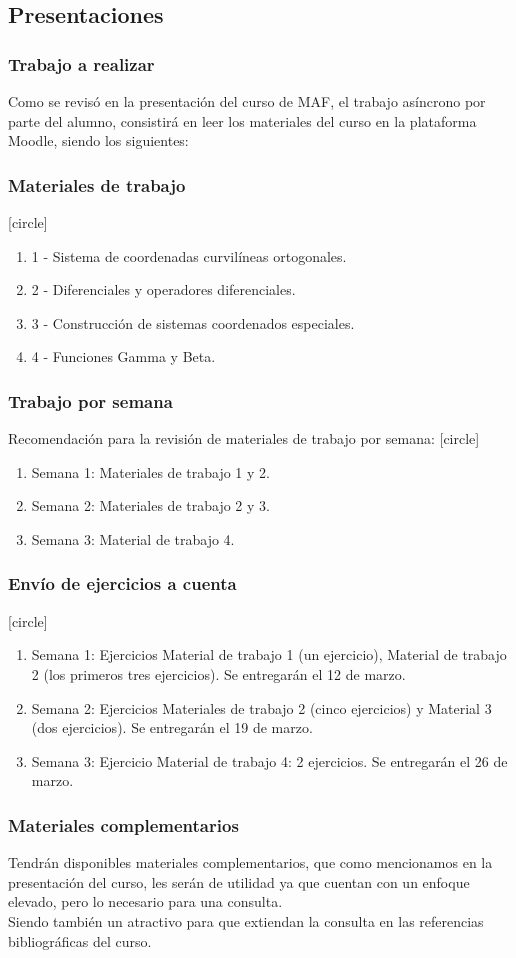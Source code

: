 \documentclass[12pt]{beamer}
\begin{document}
\subsection{Presentaciones}
\begin{frame}
\frametitle{Trabajo a realizar}
Como se revisó en la presentación del curso de MAF, el trabajo asíncrono por parte del alumno, consistirá en leer los materiales del curso en la plataforma Moodle, siendo los siguientes:
\end{frame}
\begin{frame}
\frametitle{Materiales de trabajo}
[circle]
\begin{enumerate}[<+->]
\item 1 - Sistema de coordenadas curvilíneas ortogonales.
\item 2 - Diferenciales y operadores diferenciales.
\item 3 - Construcción de sistemas coordenados especiales.
\item 4 - Funciones Gamma y Beta.
\end{enumerate}
\end{frame}
\begin{frame}
\frametitle{Trabajo por semana}
Recomendación para la revisión de materiales de trabajo por semana:
[circle]
\begin{enumerate}[<+->]
\item Semana 1: Materiales de trabajo 1 y 2.
\item Semana 2: Materiales de trabajo 2 y 3.
\item Semana 3: Material de trabajo 4.
\end{enumerate}
\end{frame}
\begin{frame}
\frametitle{Envío de ejercicios a cuenta}
[circle]
\begin{enumerate}[<+->]
\item Semana 1: Ejercicios Material de trabajo 1 (un ejercicio), Material de trabajo 2 (los primeros tres ejercicios). Se entregarán el 12 de marzo.
\item Semana 2: Ejercicios Materiales de trabajo 2 (cinco ejercicios) y Material 3 (dos ejercicios). Se entregarán el 19 de marzo.
\item Semana 3: Ejercicio Material de trabajo 4: 2 ejercicios. Se entregarán el 26 de marzo.
\end{enumerate}
\end{frame}
\begin{frame}
\frametitle{Materiales complementarios}
Tendrán disponibles materiales complementarios, que como mencionamos en la presentación del curso, les serán de utilidad ya que cuentan con un enfoque elevado, pero lo necesario para una consulta.
\\
\bigskip
Siendo también un atractivo para que extiendan la consulta en las referencias bibliográficas del curso.
\end{frame}
\end{document}
